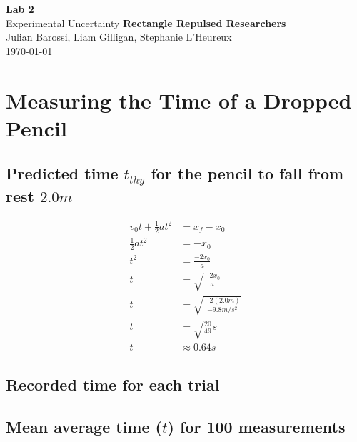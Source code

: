 \documentclass[11pt, letterpaper, includehead]{article}
\begin{document}
  \begin{titlepage} 
    \begin{center}
      \Huge{\textbf{Lab 2}}\\
      \Huge{Experimental Uncertainty}
      \vfill
      \large{\textbf{Rectangle Repulsed Researchers}}\\
      \large{Julian Barossi, Liam Gilligan, Stephanie L'Heureux}\\
      \vspace{0.5cm}
      \normalsize
      \today
    \end{center}
  \end{titlepage}

  \tableofcontents
  \pagebreak %


  \pagestyle{fancy}
  \fancyhead{}

  \section{Measuring the Time of a Dropped Pencil} %
  
  \subsection{Predicted time $t_{thy}$ for the pencil to fall from rest $2.0m$} %

  \begin{align*}
    v_0t + \frac{1}{2}at^2 &= x_f - x_0\\
    \frac{1}{2}at^2 &= -x_0\\
    t^2 &= \frac{-2x_0}{a}\\
    t &= \sqrt{\frac{-2x_0}{a}}\\
    t &= \sqrt{\frac{-2(2.0m)}{-9.8m/s^2}}\\
    t &= \sqrt{\frac{20}{49}}s\\
    t &\approx 0.64s
  \end{align*}

  \subsection{Recorded time for each trial} %

  \setcounter{subsection}{3} %
  \subsection{Mean average time ($\bar{t}$) for 100 measurements} %
\end{document}
